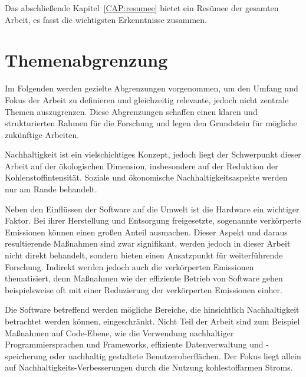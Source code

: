 Das abschließende Kapitel~\ref{CAP:resumee} bietet ein Resümee der gesamten Arbeit, es fasst die wichtigsten Erkenntnisse zusammen.

\section{Themenabgrenzung}
Im Folgenden werden gezielte Abgrenzungen vorgenommen, um den Umfang und Fokus der Arbeit zu definieren und gleichzeitig relevante, jedoch nicht zentrale Themen auszugrenzen.
Diese Abgrenzungen schaffen einen klaren und strukturierten Rahmen für die Forschung und legen den Grundstein für mögliche zukünftige Arbeiten.

Nachhaltigkeit ist ein vielschichtiges Konzept, jedoch liegt der Schwerpunkt dieser Arbeit auf der ökologischen Dimension, insbesondere auf der Reduktion der Kohlenstoffintensität.
Soziale und ökonomische Nachhaltigkeitsaspekte werden nur am Rande behandelt.

Neben den Einflüssen der Software auf die Umwelt ist die Hardware ein wichtiger Faktor.
Bei ihrer Herstellung und Entsorgung freigesetzte, sogenannte verkörperte Emissionen können einen großen Anteil ausmachen.
Dieser Aspekt und daraus resultierende Maßnahmen sind zwar signifikant, werden jedoch in dieser Arbeit nicht direkt behandelt, sondern bieten einen Ansatzpunkt für weiterführende Forschung.
Indirekt werden jedoch auch die verkörperten Emissionen thematisiert, denn Maßnahmen wie der effiziente Betrieb von Software gehen beispielsweise oft mit einer Reduzierung der verkörperten Emissionen einher.

Die Software betreffend werden mögliche Bereiche, die hinsichtlich Nachhaltigkeit betrachtet werden können, eingeschränkt.
Nicht Teil der Arbeit sind zum Beispiel Maßnahmen auf Code-Ebene, wie die Verwendung nachhaltiger Programmiersprachen und Frameworks, effiziente Datenverwaltung und -speicherung oder nachhaltig gestaltete Benutzeroberflächen.
Der Fokus liegt allein auf Nachhaltigkeits-Verbesserungen durch die Nutzung kohlestoffarmen Stroms.

